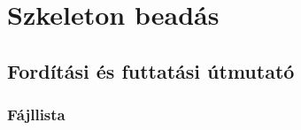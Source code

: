 \chapter{Szkeleton beadás}

\thispagestyle{fancy}

\section{Fordítási és futtatási útmutató}

\subsection{Fájllista}

